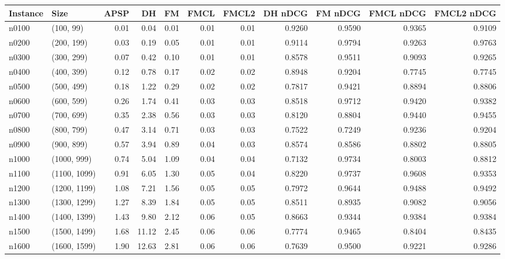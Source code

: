 \begin{tabular}{llrrrrrrrrr}
\toprule
Instance &         Size &  APSP &    DH &   FM &  FMCL &  FMCL2 &  DH nDCG &  FM nDCG &  FMCL nDCG &  FMCL2 nDCG \\
\midrule
   n0100 &    (100, 99) &  0.01 &  0.04 & 0.01 &  0.01 &   0.01 &   0.9260 &   0.9590 &     0.9365 &      0.9109 \\
   n0200 &   (200, 199) &  0.03 &  0.19 & 0.05 &  0.01 &   0.01 &   0.9114 &   0.9794 &     0.9263 &      0.9763 \\
   n0300 &   (300, 299) &  0.07 &  0.42 & 0.10 &  0.01 &   0.01 &   0.8578 &   0.9511 &     0.9093 &      0.9265 \\
   n0400 &   (400, 399) &  0.12 &  0.78 & 0.17 &  0.02 &   0.02 &   0.8948 &   0.9204 &     0.7745 &      0.7745 \\
   n0500 &   (500, 499) &  0.18 &  1.22 & 0.29 &  0.02 &   0.02 &   0.7817 &   0.9421 &     0.8894 &      0.8806 \\
   n0600 &   (600, 599) &  0.26 &  1.74 & 0.41 &  0.03 &   0.03 &   0.8518 &   0.9712 &     0.9420 &      0.9382 \\
   n0700 &   (700, 699) &  0.35 &  2.38 & 0.56 &  0.03 &   0.03 &   0.8120 &   0.8804 &     0.9440 &      0.9455 \\
   n0800 &   (800, 799) &  0.47 &  3.14 & 0.71 &  0.03 &   0.03 &   0.7522 &   0.7249 &     0.9236 &      0.9204 \\
   n0900 &   (900, 899) &  0.57 &  3.94 & 0.89 &  0.04 &   0.03 &   0.8574 &   0.8586 &     0.8802 &      0.8805 \\
   n1000 &  (1000, 999) &  0.74 &  5.04 & 1.09 &  0.04 &   0.04 &   0.7132 &   0.9734 &     0.8003 &      0.8812 \\
   n1100 & (1100, 1099) &  0.91 &  6.05 & 1.30 &  0.05 &   0.04 &   0.8220 &   0.9737 &     0.9608 &      0.9353 \\
   n1200 & (1200, 1199) &  1.08 &  7.21 & 1.56 &  0.05 &   0.05 &   0.7972 &   0.9644 &     0.9488 &      0.9492 \\
   n1300 & (1300, 1299) &  1.27 &  8.39 & 1.84 &  0.05 &   0.05 &   0.8511 &   0.8935 &     0.9082 &      0.9056 \\
   n1400 & (1400, 1399) &  1.43 &  9.80 & 2.12 &  0.06 &   0.05 &   0.8663 &   0.9344 &     0.9384 &      0.9384 \\
   n1500 & (1500, 1499) &  1.68 & 11.12 & 2.45 &  0.06 &   0.06 &   0.7774 &   0.9465 &     0.8404 &      0.8435 \\
   n1600 & (1600, 1599) &  1.90 & 12.63 & 2.81 &  0.06 &   0.06 &   0.7639 &   0.9500 &     0.9221 &      0.9286 \\

\end{tabular}
